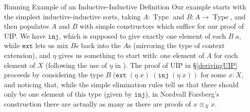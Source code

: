 \documentclass[runningheads]{llncs}
\DeclareMathOperator{\USet}{Type}
\newcommand{\IdA}[3]{{#1}\equiv_{#3}{#2}}
\newcommand{\join}{\texttt{ext}}
\newcommand{\inj}{\texttt{inj}}
\def\Forsberg/{Nordvall Forsberg}
\begin{document}
\begin{subsection}{\label{II-examples}Running Example of an Inductive-Inductive Definition}
Our example starts with the simplest inductive-inductive sorts, taking $A : \USet$ and $B : A \to \USet$, and then populates $A$ and $B$ with simple constructors which suffice for our proof of UIP. We have $\inj$, which is supposed to give exactly one element of each $B\;a$, while $\join$ lets us mix $B$s back into the $A$s (mirroring the type of context extension), and $\eta$ gives us something to start with: one element of $A$ for each element of $X$ (following the use of $\eta$ in \citep[Example 3.3]{nordvallforsberg2013thesis}). The proof of UIP in \S\ref{derivingUIP} proceeds by considering the type $B\;(\join\;(\eta\;x)\;(\inj\;(\eta\;x))$ for some $x : X$, and noticing that, while the simple elimination rules tell us that there should only be one element of this type (given by $\inj$), in \Forsberg/'s construction there are actually as many as there are proofs of $\IdA{x}{x}{X}$.


\end{subsection}
\end{document}
